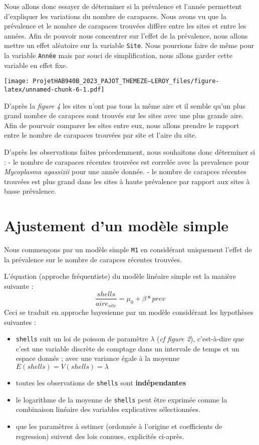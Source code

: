 \documentclass[
]{article}
\providecommand{\tightlist}{%
  \setlength{\itemsep}{0pt}\setlength{\parskip}{0pt}}
\begin{document}
Nous allons donc essayer de déterminer si la prévalence et l'année
permettent d'expliquer les variations du nombre de carapaces. Nous avons
vu que la prévalence et le nombre de carapaces trouvées diffère entre
les sites et entre les années. Afin de pouvoir nous concentrer sur
l'effet de la prévalence, nous allons mettre un effet aléatoire sur la
variable \texttt{Site}. Nous pourrions faire de même pour la variable
\texttt{Année} mais par souci de simplification, nous allons garder
cette variable en effet fixe.

\texttt{[image: ProjetHAB940B\_2023\_PAJOT\_THEMEZE--LEROY\_files/figure-latex/unnamed-chunk-6-1.pdf]}

D'après la \emph{figure 4} les sites n'ont pas tous la même aire et il
semble qu'un plus grand nombre de carapces sont trouvés sur les sites
avec une plus grande aire. Afin de pourvoir comparer les sites entre
eux, nous allons prendre le rapport entre le nombre de carapaces
trouvées par site et l'aire du site.

D'après les observations faites précedemment, nous souhaitons donc
déterminer si : - le nombre de carapaces récentes trouvées est correlée
avec la prevalence pour \emph{Mycoplasma agassizii} pour une année
donnée. - le nombre de carapces récentes trouvées est plus grand dans
les sites à haute prévalence par rapport aux sites à basse prévalence.

\hypertarget{ajustement-dun-moduxe8le-simple}{%
\section{\texorpdfstring{\textbf{Ajustement d'un modèle
simple}}{Ajustement d'un modèle simple}}\label{ajustement-dun-moduxe8le-simple}}

Nous commençons par un modèle simple \texttt{M1} en considérant
uniquement l'effet de la prévalence sur le nombre de carapces récentes
trouvées.

L'équation (approche fréquentiste) du modèle linéaire simple est la
manière suivante : \newline 
\[\frac {shells} {aire_{site}} = \mu_0 + \beta * prev\] Ceci se traduit
en approche bayesienne par un modèle considérant les hypothèses
suivantes :

\begin{itemize}
\tightlist
\item
  \texttt{shells} suit un loi de poisson de paramètre \(\lambda\)
  (\emph{cf figure 2}), c'est-à-dire que c'est une variable discrète de
  comptage dans un intervale de temps et un espace donnés ; avec une
  variance égale à la moyenne \(E(shells)=V(shells)= \lambda\)
\item
  toutes les observations de \texttt{shells} sont \textbf{indépendantes}
\item
  le logarithme de la moyenne de \texttt{shells} peut être exprimée
  comme la combinaison linéaire des variables explicatives
  sélectionnées.
\item
  que les paramètres à estimer (ordonnée à l'origine et coefficients de
  regression) suivent des lois connues, explicités ci-après.
\end{itemize}
\end{document}
